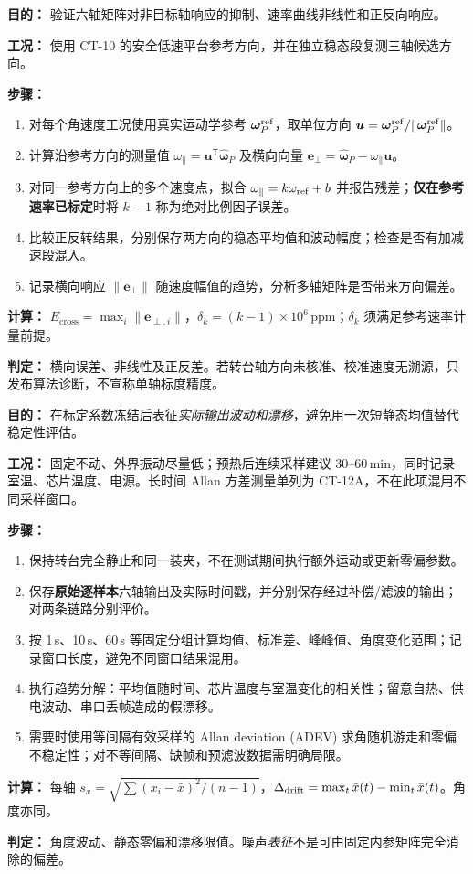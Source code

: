 \textbf{目的：} 验证六轴矩阵对非目标轴响应的抑制、速率曲线非线性和正反向响应。
\par\textbf{工况：} 使用 CT-10 的安全低速平台参考方向，并在独立稳态段复测三轴候选方向。
\par\textbf{步骤：}
\begin{enumerate}
\item 对每个角速度工况使用真实运动学参考 $\bm\omega_P^{\rm ref}$，取单位方向 $\bm u=\bm\omega_P^{\rm ref}/\|\bm\omega_P^{\rm ref}\|$。
\item 计算沿参考方向的测量值 $\omega_\parallel=\bm u^{\mathsf T}\hat{\bm\omega}_P$ 及横向向量 $\bm e_\perp=\hat{\bm\omega}_P-\omega_\parallel\bm u$。
\item 对同一参考方向上的多个速度点，拟合 $\omega_\parallel=k\omega_{\rm ref}+b$ 并报告残差；\textbf{仅在参考速率已标定}时将 $k-1$ 称为绝对比例因子误差。
\item 比较正反转结果，分别保存两方向的稳态平均值和波动幅度；检查是否有加减速段混入。
\item 记录横向响应 $\|\bm e_\perp\|$ 随速度幅值的趋势，分析多轴矩阵是否带来方向偏差。
\end{enumerate}
\textbf{计算：} $E_\mathrm{cross}=\max_i\|\bm e_{\perp,i}\|$，$\delta_k=(k-1)\times 10^6\,\mathrm{ppm}$；$\delta_k$ 须满足参考速率计量前提。
\par\textbf{判定：} 横向误差、非线性及正反差\pending。若转台轴方向未核准、校准速度无溯源，只发布算法诊断，不宣称单轴标度精度。

\textbf{目的：} 在标定系数冻结后表征\emph{实际输出波动和漂移}，避免用一次短静态均值替代稳定性评估。
\par\textbf{工况：} 固定不动、外界振动尽量低；预热后连续采样建议 $30$--$60\,\mathrm{min}$，同时记录室温、芯片温度、电源。长时间 Allan 方差测量单列为 CT-12A，不在此项混用不同采样窗口。
\par\textbf{步骤：}
\begin{enumerate}
\item 保持转台完全静止和同一装夹，不在测试期间执行额外运动或更新零偏参数。
\item 保存\textbf{原始逐样本}六轴输出及实际时间戳，并分别保存经过补偿/滤波的输出；对两条链路分别评价。
\item 按 1\,s、10\,s、60\,s 等固定分组计算均值、标准差、峰峰值、角度变化范围；记录窗口长度，避免不同窗口结果混用。
\item 执行趋势分解：平均值随时间、芯片温度与室温变化的相关性；留意自热、供电波动、串口丢帧造成的假漂移。
\item 需要时使用等间隔有效采样的 Allan deviation (ADEV) 求角随机游走和零偏不稳定性；对不等间隔、缺帧和预滤波数据需明确局限。
\end{enumerate}
\textbf{计算：} 每轴 $s_x=\sqrt{\sum(x_i-\bar x)^2/(n-1)}$，$\Delta_{\rm drift}=\max_t\bar x(t)-\min_t\bar x(t)$。角度亦同。
\par\textbf{判定：} 角度波动、静态零偏和漂移限值\pending。噪声\emph{表征}不是可由固定内参矩阵完全消除的偏差。

